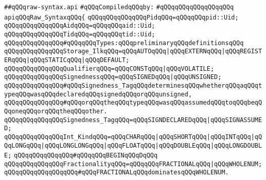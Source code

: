 \label{src/lib/c-kit/src/ast/raw-syntax.api}
\verb|##qQQqraw-syntax.api|\newline
\newline
\verb|#qQQqCompiledqQQqby:|\newline
\verb|#qQQqqQQqqQQqqQQqqQQq|\newline
\newline
\verb|apiqQQqRaw_SyntaxqQQq{|\newline
\newline
\verb|qQQqqQQqqQQqqQQqPidqQQq=qQQqqQQqpid::Uid;|\newline
\verb|qQQqqQQqqQQqqQQqAidqQQq=qQQqqQQqaid::Uid;|\newline
\verb|qQQqqQQqqQQqqQQqTidqQQq=qQQqqQQqtid::Uid;|\newline
\newline
\verb|qQQqqQQqqQQqqQQq#qQQqqQQqTypes:qQQqpreliminaryqQQqdefinitionsqQQq|\newline
\verb|qQQqqQQqqQQqqQQqStorage_IlkqQQq=qQQqAUTOqQQq|\verb#|qQQqEXTERNqQQq|qQQqREGISTERqQQq|qQQqSTATICqQQq|qQQqDEFAULT;#\newline
\newline
\verb|qQQqqQQqqQQqqQQqQualifierqQQq=qQQqCONSTqQQq|\verb#|qQQqVOLATILE;#\newline
\newline
\verb|qQQqqQQqqQQqqQQqSignednessqQQq=qQQqSIGNEDqQQq|\verb#|qQQqUNSIGNED;#\newline
\newline
\verb|qQQqqQQqqQQqqQQq#qQQqSignedness_TagqQQqdeterminesqQQqwhetherqQQqaqQQqtypeqQQqwasqQQqdeclaredqQQqsignedqQQqorqQQqunsigned,|\newline
\verb|qQQqqQQqqQQqqQQq#qQQqorqQQqtheqQQqtypeqQQqwasqQQqassumedqQQqtoqQQqbeqQQqoneqQQqorqQQqtheqQQqother.|\newline
\verb|qQQqqQQqqQQqqQQqSignedness_TagqQQq=qQQqSIGNDECLAREDqQQq|\verb#|qQQqSIGNASSUMED;#\newline
\newline
\verb|qQQqqQQqqQQqqQQqInt_KindqQQq=qQQqCHARqQQq|\verb#|qQQqSHORTqQQq|qQQqINTqQQq|qQQqLONGqQQq|qQQqLONGLONGqQQq|qQQqFLOATqQQq|qQQqDOUBLEqQQq|qQQqLONGDOUBLE;#\newline
\newline
\verb|qQQqqQQqqQQqqQQq#qQQqqQQqBEGINqQQqDqQQq|\newline
\verb|qQQqqQQqqQQqqQQqFractionalityqQQq=qQQqqQQqFRACTIONALqQQq|\verb#|qQQqWHOLENUM;qQQqqQQqqQQqqQQqqQQq#\verb|#qQQqFRACTIONALqQQqdominatesqQQqWHOLENUM.|\newline
